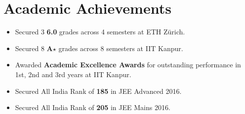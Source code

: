 \section*{Academic Achievements}
\begin{itemize}[leftmargin=*,itemsep=0mm,label=\textbullet]

\item Secured 3 \textbf{6.0} grades across 4 semesters at ETH Zürich.
\item Secured 8 \textbf{A$\star$} grades across 8 semesters at IIT Kanpur.
\item Awarded \textbf{Academic Excellence Awards} for outstanding performance in 1st, 2nd and 3rd years at IIT Kanpur.
\item Secured All India Rank of \textbf{185} in JEE Advanced 2016.
\item Secured All India Rank of \textbf{205} in JEE Mains 2016.

\end{itemize}
